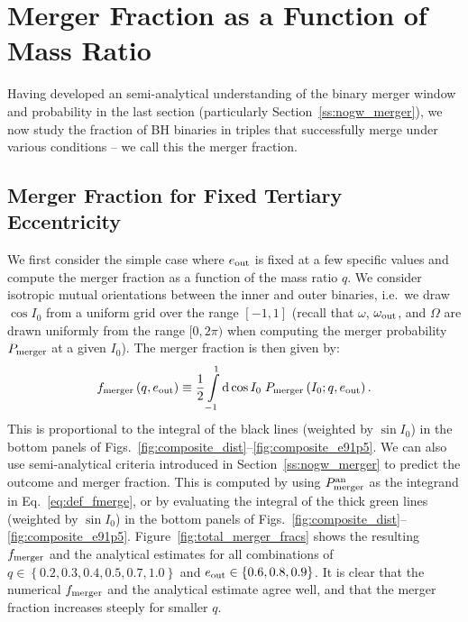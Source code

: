 \documentclass[
        fleqn,
        usenatbib,
    ]{mnras}
\newcommand*{\p}[1]{\left(#1\right)}
\newcommand*{\z}[1]{\left\{#1\right\}}
\begin{document}
\section{Merger Fraction as a Function of Mass Ratio}\label{s:merger_frac}

Having developed an semi-analytical understanding of the binary
merger window and probability in the last section (particularly
Section~\ref{ss:nogw_merger}), we now study the fraction of BH binaries in
triples that successfully merge under various conditions -- we %
call this the merger fraction.

\subsection{Merger Fraction for Fixed Tertiary Eccentricity}

We first consider the simple case where $e_{\rm out}$ is fixed at a few
specific values and compute the merger fraction as a function of the mass ratio
$q$. We consider isotropic mutual orientations between the inner and outer
binaries, i.e.\ we draw $\cos I_0$ from a uniform grid over the
range $[-1, 1]$ (recall that $\omega$, $\omega_{\rm out}$, and $\Omega$ are
drawn uniformly from the range $[0, 2\pi)$ %
when computing the merger probability $P_{\rm merger}$ at a given $I_0$). The
merger fraction is then given by:
\begin{align}
    f_{\rm merger}\p{q, e_{\rm out}} \equiv
        \frac{1}{2}\int\limits_{-1}^1\mathrm{d}\cos I_0\;
            P_{\rm merger}\p{I_0; q, e_{\rm out}} .\label{eq:def_fmerge}
\end{align}
This is proportional to the integral of the black lines (weighted by $\sin I_0$)
in the bottom panels of
Figs.~\ref{fig:composite_dist}--\ref{fig:composite_e91p5}. We can also use
semi-analytical criteria introduced in
Section~\ref{ss:nogw_merger} to predict the outcome and merger fraction. This is
computed by using $P_{\rm merger}^{\rm an}$ as the integrand in
Eq.~\eqref{eq:def_fmerge}, or by evaluating the integral of the thick green
lines (weighted by $\sin I_0$) in the bottom panels of
Figs.~\ref{fig:composite_dist}--\ref{fig:composite_e91p5}.
Figure~\ref{fig:total_merger_fracs} shows the resulting $f_{\rm merger}$ and the
analytical estimates for all combinations of $q \in \z{0.2, 0.3, 0.4, 0.5, 0.7,
1.0}$ and $e_{\rm out} \in \z{0.6, 0.8, 0.9}$. It is clear that the numerical
$f_{\rm merger}$ and the analytical estimate agree well, and that the merger
fraction increases steeply for smaller $q$.
\end{document}
